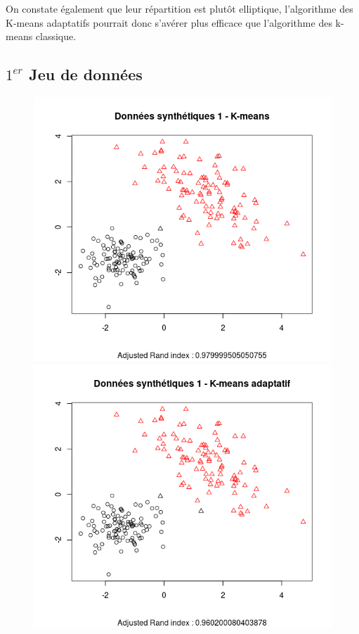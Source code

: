 \documentclass[a4paper, titlepage]{report}
\begin{document}
On constate également que leur répartition est plutôt elliptique, l'algorithme des K-means adaptatifs pourrait donc s'avérer plus efficace que l'algorithme des k-means classique.

\subsection*{$1^{er}$ Jeu de données}

\begin{figure}[h]
	\begin{center}
		\includegraphics[scale = 0.35]{./doc/synt-1-k.png}
		\includegraphics[scale = 0.35]{./doc/synt-1-ka.png}
	\end{center}
\end{figure}
\end{document}
